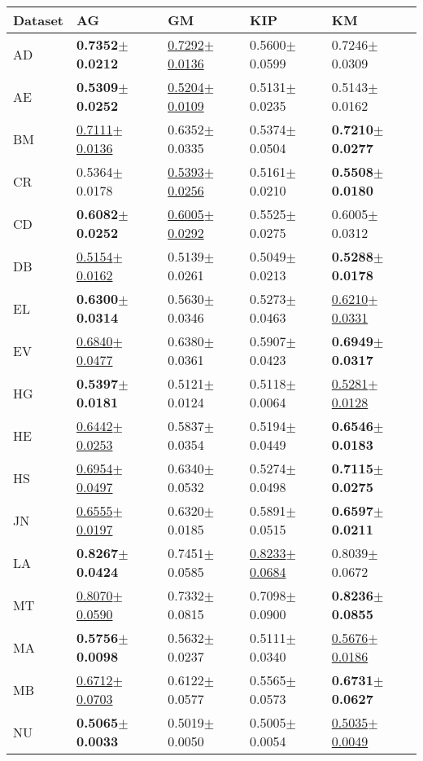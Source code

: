 \begin{tabular}{lllll}
\toprule
Dataset & AG & GM & KIP & KM \\
\midrule
AD & \textbf{0.7352$\pm$0.0212} & \underline{0.7292$\pm$0.0136} & 0.5600$\pm$0.0599 & 0.7246$\pm$0.0309 \\
AE & \textbf{0.5309$\pm$0.0252} & \underline{0.5204$\pm$0.0109} & 0.5131$\pm$0.0235 & 0.5143$\pm$0.0162 \\
BM & \underline{0.7111$\pm$0.0136} & 0.6352$\pm$0.0335 & 0.5374$\pm$0.0504 & \textbf{0.7210$\pm$0.0277} \\
CR & 0.5364$\pm$0.0178 & \underline{0.5393$\pm$0.0256} & 0.5161$\pm$0.0210 & \textbf{0.5508$\pm$0.0180} \\
CD & \textbf{0.6082$\pm$0.0252} & \underline{0.6005$\pm$0.0292} & 0.5525$\pm$0.0275 & 0.6005$\pm$0.0312 \\
DB & \underline{0.5154$\pm$0.0162} & 0.5139$\pm$0.0261 & 0.5049$\pm$0.0213 & \textbf{0.5288$\pm$0.0178} \\
EL & \textbf{0.6300$\pm$0.0314} & 0.5630$\pm$0.0346 & 0.5273$\pm$0.0463 & \underline{0.6210$\pm$0.0331} \\
EV & \underline{0.6840$\pm$0.0477} & 0.6380$\pm$0.0361 & 0.5907$\pm$0.0423 & \textbf{0.6949$\pm$0.0317} \\
HG & \textbf{0.5397$\pm$0.0181} & 0.5121$\pm$0.0124 & 0.5118$\pm$0.0064 & \underline{0.5281$\pm$0.0128} \\
HE & \underline{0.6442$\pm$0.0253} & 0.5837$\pm$0.0354 & 0.5194$\pm$0.0449 & \textbf{0.6546$\pm$0.0183} \\
HS & \underline{0.6954$\pm$0.0497} & 0.6340$\pm$0.0532 & 0.5274$\pm$0.0498 & \textbf{0.7115$\pm$0.0275} \\
JN & \underline{0.6555$\pm$0.0197} & 0.6320$\pm$0.0185 & 0.5891$\pm$0.0515 & \textbf{0.6597$\pm$0.0211} \\
LA & \textbf{0.8267$\pm$0.0424} & 0.7451$\pm$0.0585 & \underline{0.8233$\pm$0.0684} & 0.8039$\pm$0.0672 \\
MT & \underline{0.8070$\pm$0.0590} & 0.7332$\pm$0.0815 & 0.7098$\pm$0.0900 & \textbf{0.8236$\pm$0.0855} \\
MA & \textbf{0.5756$\pm$0.0098} & 0.5632$\pm$0.0237 & 0.5111$\pm$0.0340 & \underline{0.5676$\pm$0.0186} \\
MB & \underline{0.6712$\pm$0.0703} & 0.6122$\pm$0.0577 & 0.5565$\pm$0.0573 & \textbf{0.6731$\pm$0.0627} \\
NU & \textbf{0.5065$\pm$0.0033} & 0.5019$\pm$0.0050 & 0.5005$\pm$0.0054 & \underline{0.5035$\pm$0.0049} \\

\end{tabular}
